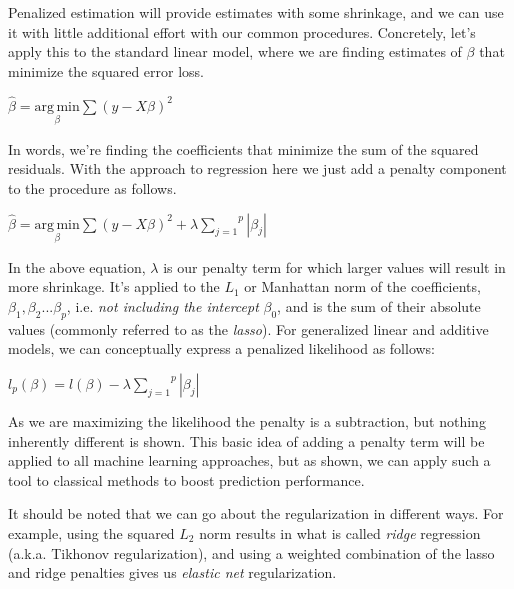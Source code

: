 \documentclass[english,nohyper,titlepage]{tufte-handout}
\begin{document}
Penalized estimation will provide estimates with some shrinkage, and we can use it with little additional effort with our common procedures.  Concretely, let's apply this to the standard linear model, where we are finding estimates of $\beta$ that minimize the squared error loss.

\vspace{.25cm}
$\hat\beta = \underset{\beta}{\mathrm{arg\, min}} \sum{(y-X\beta)^2}$ 
\vspace{.25cm}

In words, we're finding the coefficients that minimize the sum of the squared residuals.  With the approach to regression here we just add a penalty component to the procedure as follows.

\vspace{.25cm}
$\hat\beta = \underset{\beta}{\mathrm{arg\, min}} \sum{(y-X\beta)^2} + \lambda\overset{p}{\underset{j=1}{\sum}}{\left|\beta_j\right|}$ 
\vspace{.25cm}

%
In the above equation, $\lambda$ is our penalty term for which larger values will result in more shrinkage.  It's applied to the $L_1$ or Manhattan norm of the coefficients, $\beta_1,\beta_2...\beta_p$, i.e. \emph{not including the intercept} $\beta_0$, and is the sum of their absolute values (commonly referred to as the \emph{lasso}). For generalized linear and additive models, we can conceptually express a penalized likelihood as follows:

\vspace{.25cm}
$l_p(\beta) = l(\beta) - \lambda\overset{p}{\underset{j=1}{\sum}}{\left|\beta_j\right|}$ 
\vspace{.25cm}

As we are maximizing the likelihood the penalty is a subtraction, but nothing inherently different is shown.  This basic idea of adding a penalty term will be applied to all machine learning approaches, but as shown, we can apply such a tool to classical methods to boost prediction performance.

It should be noted that we can go about the regularization in different ways.  For example, using the squared $L_2$ norm results in what is called \emph{ridge} regression (a.k.a. Tikhonov regularization), and using a weighted combination of the lasso and ridge penalties gives us \emph{elastic net} regularization. 
\end{document}
